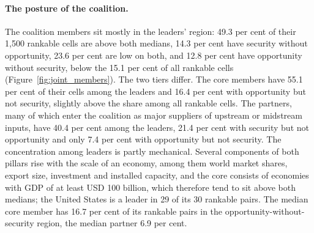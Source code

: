 \paragraph{The posture of the coalition.} The coalition members sit mostly in the leaders'
region: 49.3 per cent of their 1{,}500 rankable cells are above both medians, 14.3 per cent have
security without opportunity, 23.6 per cent are low on both, and 12.8 per cent have opportunity
without security, below the 15.1 per cent of all rankable cells (Figure~\ref{fig:joint_members}).
The two tiers differ. The core members have 55.1 per cent of their cells among the leaders and
16.4 per cent with opportunity but not security, slightly above the share among all rankable
cells. The partners, many of which enter the coalition as major suppliers of upstream or
midstream inputs, have 40.4 per cent among the leaders, 21.4 per cent with security but not
opportunity and only 7.4 per cent with opportunity but not security. The concentration among
leaders is partly mechanical. Several components of both pillars rise with the scale of an
economy, among them world market shares, export size, investment and installed capacity, and the
core consists of economies with GDP of at least USD 100 billion, which therefore tend to sit above
both medians; the United States is a leader in 29 of its 30 rankable pairs. The median core
member has 16.7 per cent of its rankable pairs in the opportunity-without-security region, the
median partner 6.9 per cent.

